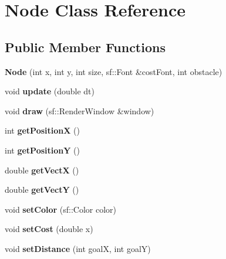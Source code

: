 \hypertarget{class_node}{}\section{Node Class Reference}
\label{class_node}
\subsection*{Public Member Functions}
\begin{DoxyCompactItemize}
\item 
\mbox{\label{class_node_a821ac801921f60f513c6e9870413316a}} 
{\bfseries Node} (int x, int y, int size, sf\+::\+Font \&cost\+Font, int obstacle)
\item 
\mbox{\label{class_node_acaf47c612c7c8762ec58cb7f15019357}} 
void {\bfseries update} (double dt)
\item 
\mbox{\label{class_node_a0c3d6ad1d2e0b22ca4f4327a8fb93e31}} 
void {\bfseries draw} (sf\+::\+Render\+Window \&window)
\item 
\mbox{\label{class_node_a535896357ea40bc56fe4d6aed70b6361}} 
int {\bfseries get\+PositionX} ()
\item 
\mbox{\label{class_node_a9a5a7aa1c1cade5e1c959115d8f56441}} 
int {\bfseries get\+PositionY} ()
\item 
\mbox{\label{class_node_ab680abb24e66f0ac44ad1c01100c284d}} 
double {\bfseries get\+VectX} ()
\item 
\mbox{\label{class_node_a94cc29a521ebaf4de2a8d71b7e55346e}} 
double {\bfseries get\+VectY} ()
\item 
\mbox{\label{class_node_afa06743d48ed804dbadfe408c6b9c7e5}} 
void {\bfseries set\+Color} (sf\+::\+Color color)
\item 
\mbox{\label{class_node_adefee65f1133ce5f2e0b5a363e250ae6}} 
void {\bfseries set\+Cost} (double x)
\item 
\mbox{\label{class_node_a2066fcdaacfab4e47e976a9a4f60f011}} 
void {\bfseries set\+Distance} (int goalX, int goalY)

\end{DoxyCompactItemize}
